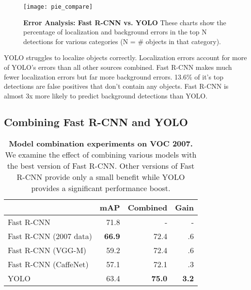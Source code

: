 \documentclass[10pt,twocolumn,letterpaper]{article}
\begin{document}
\begin{figure}[t]
      \centering
        \texttt{[image: pie\_compare]}
      \caption{\small \textbf{Error Analysis: Fast R-CNN vs. YOLO} These charts show the percentage of localization and background errors in the top N detections for various categories (N = \# objects in that category).}
      \label{errors}
   \end{figure}
   
   


YOLO struggles to localize objects correctly. Localization errors account for more of YOLO's errors than all other sources combined. Fast R-CNN makes much fewer localization errors but far more background errors. 13.6\% of it's top detections are false positives that don't contain any objects. Fast R-CNN is almost 3x more likely to predict background detections than YOLO.





\subsection{Combining Fast R-CNN and YOLO}

\begin{table}[b]
\begin{center}
\begin{tabular}{lrrr}
 & mAP & Combined & Gain \\
\hline
Fast R-CNN & 71.8 & - & - \\
\hline
Fast R-CNN (2007 data) & \textbf{66.9} & 72.4 & .6  \\
Fast R-CNN (VGG-M) & 59.2 & 72.4 & .6 \\
Fast R-CNN (CaffeNet) & 57.1  & 72.1 & .3\\
YOLO & 63.4  & \textbf{75.0} & \textbf{3.2}\\
\end{tabular}
\end{center}
\caption{\small \textbf{Model combination experiments on VOC 2007.} We examine the effect of combining various models with the best version of Fast R-CNN. Other versions of Fast R-CNN provide only a small benefit while YOLO provides a significant performance boost.}
\label{combine}
\end{table}
\end{document}

